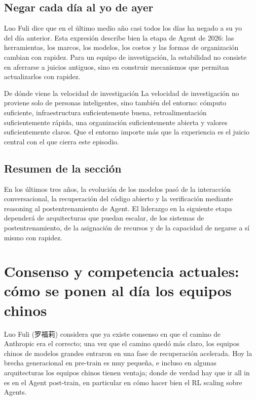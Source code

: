 \documentclass[a4paper]{article}
\begin{document}
\subsection{Negar cada día al yo de ayer}

Luo Fuli dice que en el último medio año casi todos los días ha negado a su yo del día anterior. Esta expresión describe bien la etapa de Agent de 2026: las herramientas, los marcos, los modelos, los costos y las formas de organización cambian con rapidez. Para un equipo de investigación, la estabilidad no consiste en aferrarse a juicios antiguos, sino en construir mecanismos que permitan actualizarlos con rapidez.

\begin{importantbox}{De dónde viene la velocidad de investigación}
La velocidad de investigación no proviene solo de personas inteligentes, sino también del entorno: cómputo suficiente, infraestructura suficientemente buena, retroalimentación suficientemente rápida, una organización suficientemente abierta y valores suficientemente claros. Que el entorno importe más que la experiencia es el juicio central con el que cierra este episodio.
\end{importantbox}

\subsection{Resumen de la sección}

En los últimos tres años, la evolución de los modelos pasó de la interacción conversacional, la recuperación del código abierto y la verificación mediante reasoning al postentrenamiento de Agent. El liderazgo en la siguiente etapa dependerá de arquitecturas que puedan escalar, de los sistemas de postentrenamiento, de la asignación de recursos y de la capacidad de negarse a sí mismo con rapidez.
\section{Consenso y competencia actuales: cómo se ponen al día los equipos chinos}

Luo Fuli (罗福莉) considera que ya existe consenso en que el camino de Anthropic era el correcto; una vez que el camino quedó más claro, los equipos chinos de modelos grandes entraron en una fase de recuperación acelerada. Hoy la brecha generacional en pre-train es muy pequeña, e incluso en algunas arquitecturas los equipos chinos tienen ventaja; donde de verdad hay que ir all in es en el Agent post-train, en particular en cómo hacer bien el RL scaling sobre Agents.
\end{document}
